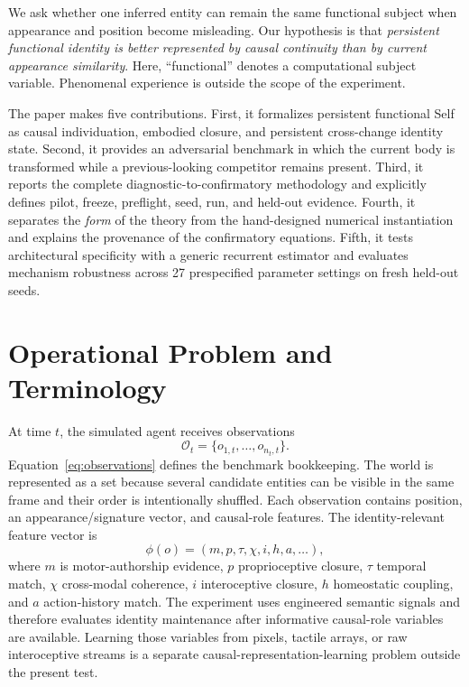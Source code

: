\documentclass[journal]{IEEEtran}
\begin{document}
We ask whether one inferred entity can remain the same functional subject when appearance and position become misleading. Our hypothesis is that \emph{persistent functional identity is better represented by causal continuity than by current appearance similarity}. Here, ``functional'' denotes a computational subject variable. Phenomenal experience is outside the scope of the experiment.

The paper makes five contributions. First, it formalizes persistent functional Self as causal individuation, embodied closure, and persistent cross-change identity state. Second, it provides an adversarial benchmark in which the current body is transformed while a previous-looking competitor remains present. Third, it reports the complete diagnostic-to-confirmatory methodology and explicitly defines pilot, freeze, preflight, seed, run, and held-out evidence. Fourth, it separates the \emph{form} of the theory from the hand-designed numerical instantiation and explains the provenance of the confirmatory equations. Fifth, it tests architectural specificity with a generic recurrent estimator and evaluates mechanism robustness across 27 prespecified parameter settings on fresh held-out seeds.

\section{Operational Problem and Terminology}
At time $t$, the simulated agent receives observations
\begin{equation}
\mathcal O_t=\{o_{1,t},\ldots,o_{n_t,t}\}.
\label{eq:observations}
\end{equation}
Equation~\eqref{eq:observations} defines the benchmark bookkeeping. The world is represented as a set because several candidate entities can be visible in the same frame and their order is intentionally shuffled. Each observation contains position, an appearance/signature vector, and causal-role features. The identity-relevant feature vector is
\begin{equation}
\phi(o)=(m,p,\tau,\chi,i,h,a,\ldots),
\label{eq:features}
\end{equation}
where $m$ is motor-authorship evidence, $p$ proprioceptive closure, $\tau$ temporal match, $\chi$ cross-modal coherence, $i$ interoceptive closure, $h$ homeostatic coupling, and $a$ action-history match. The experiment uses engineered semantic signals and therefore evaluates identity maintenance after informative causal-role variables are available. Learning those variables from pixels, tactile arrays, or raw interoceptive streams is a separate causal-representation-learning problem \cite{Scholkopf2021} outside the present test.
\end{document}

